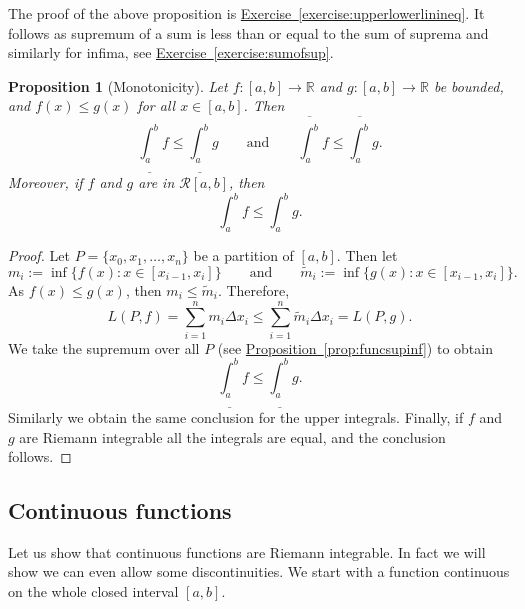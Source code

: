 \documentclass[12pt]{book}
\newcommand{\R}{{\mathbb{R}}}
\newcommand{\sR}{{\mathcal{R}}}
\theoremstyle{plain}
\newtheorem{prop}[thm]{Proposition}
\theoremstyle{remark}
\theoremstyle{definition}
\theoremstyle{exercise}
\theoremstyle{example}
\newcommand{\exerciseref}[1]{\hyperref[#1]{Exercise~\ref*{#1}}}
\newcommand{\propref}[1]{\hyperref[#1]{Proposition~\ref*{#1}}}
\begin{document}
The proof of the above proposition is \exerciseref{exercise:upperlowerlinineq}.
It follows as supremum of a sum is less than or equal to the sum of
suprema and similarly for infima, see \exerciseref{exercise:sumofsup}.

\begin{prop}[Monotonicity]
Let $f \colon [a,b] \to \R$ and $g \colon [a,b] \to \R$ be
bounded, and $f(x) \leq g(x)$
for all $x \in [a,b]$.  Then
\begin{equation*}
\underline{\int_a^b} f 
\leq
\underline{\int_a^b} g 
\qquad \text{and} \qquad
\overline{\int_a^b} f 
\leq
\overline{\int_a^b} g .
\end{equation*}
Moreover, if $f$ and $g$ are in $\sR[a,b]$, then
\begin{equation*}
\int_a^b f 
\leq
\int_a^b g .
\end{equation*}
\end{prop}

\begin{proof}
Let $P = \{ x_0, x_1, \ldots, x_n \}$ be a partition of $[a,b]$.  Then
let
\begin{equation*}
m_i := \inf \{ f(x) : x \in [x_{i-1},x_i] \}
\qquad \text{and} \qquad
\widetilde{m}_i := \inf \{ g(x) : x \in [x_{i-1},x_i] \} .
\end{equation*}
As $f(x) \leq g(x)$, then $m_i \leq \widetilde{m}_i$.
Therefore,
\begin{equation*}
L(P,f)
=
\sum_{i=1}^n m_i \Delta x_i
\leq
\sum_{i=1}^n \widetilde{m}_i \Delta x_i
=
L(P,g) .
\end{equation*}
We take the supremum over all $P$ (see \propref{prop:funcsupinf}) to obtain 
\begin{equation*}
\underline{\int_a^b} f 
\leq
\underline{\int_a^b} g .
\end{equation*}
Similarly we obtain the same conclusion for the upper integrals.
Finally,
if $f$ and $g$ are Riemann integrable all the integrals are equal,
and the conclusion follows.
\end{proof}

\subsection{Continuous functions}

Let us show that continuous functions are Riemann integrable.  In fact we
will show we can even allow some discontinuities.  We start with a
function continuous on the whole closed interval $[a,b]$.
\end{document}
